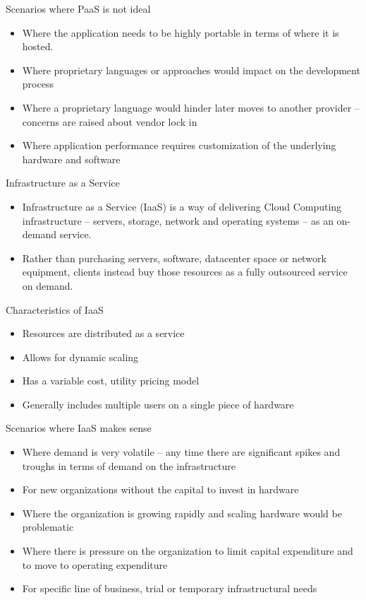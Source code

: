 \documentclass{SKP-beamer}
\begin{document}
 \begin{frame}{Scenarios where PaaS is not ideal}
 	\begin{itemize}
 		\item Where the application needs to be highly portable in terms of where it is hosted.
 		\item Where proprietary languages or approaches would impact on the development process
 		\item Where a proprietary language would hinder later moves to another	provider – concerns are raised about vendor lock in
 		\item Where application performance requires customization of the underlying hardware and software 		
 	\end{itemize}
 \end{frame} 
 
 \begin{frame}{Infrastructure as a Service}
 	\begin{itemize}
 		\item Infrastructure as a Service (IaaS) is a way of delivering Cloud Computing infrastructure – servers, storage, network and operating systems
 		– as an on-demand service.
 		\item Rather than purchasing servers, software, datacenter space or network equipment, clients instead buy those resources as a fully outsourced service on demand. 		 		
 	\end{itemize}
 \end{frame} 
 
 
  \begin{frame}{Characteristics of IaaS}
 	\begin{itemize}
 		\item Resources are distributed as a service
 		\item Allows for dynamic scaling
 		\item Has a variable cost, utility pricing model
 		\item Generally includes multiple users on a single piece of hardware	 		 		
 	\end{itemize}
 \end{frame} 
 
 \begin{frame}{Scenarios where IaaS makes sense}
 	\begin{itemize}
 		\item Where demand is very volatile – any time there are significant spikes
 		and troughs in terms of demand on the infrastructure
 		\item For new organizations without the capital to invest in hardware
 		\item Where the organization is growing rapidly and scaling hardware would be problematic
 		\item Where there is pressure on the organization to limit capital expenditure and to move to operating expenditure
 		\item For specific line of business, trial or temporary infrastructural needs		 		 		
 	\end{itemize}
 \end{frame}
\end{document}
